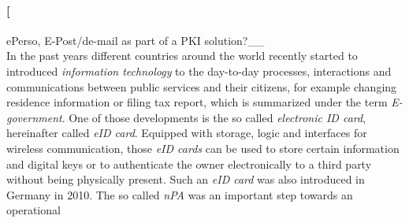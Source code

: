 \documentclass[12pt,english,a4paper,titlepage,cleardoublepage=empty,dottedtoc]{report}
\let\oldparagraph\paragraph
\renewcommand{\paragraph}[1]{\oldparagraph{#1}\mbox{}}
\begin{document}
\paragraph[ePerso, E-Post/de-mail as part of a PKI solution?\_\_\\
In the past years different countries around the world recently started
to introduced \emph{information technology} to the day-to-day processes,
interactions and communications between public services and their
citizens, for example changing residence information or filing tax
report, which is summarized under the term \emph{E-government}. One of
those developments is the so called \emph{electronic ID card},
hereinafter called \emph{eID card}. Equipped with storage, logic and
interfaces for wireless communication, those \emph{eID cards} can be
used to store certain information and digital keys or to authenticate
the owner electronically to a third party without being physically
present. Such an \emph{eID card} was also introduced in Germany in 2010.
The so called \emph{nPA} was an important step towards an operational
\end{document}
